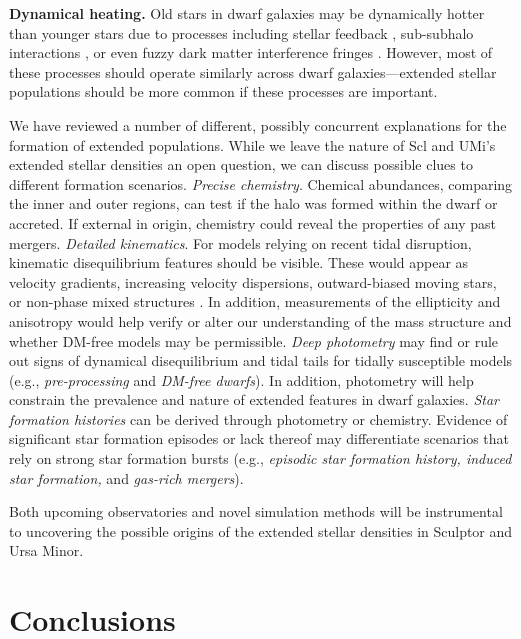 \documentclass{aa}
\begin{document}
\textbf{Dynamical heating.} Old stars in dwarf galaxies may be
dynamically hotter than younger stars due to processes including stellar
feedback
\citep{stinson+2009, maxwell+2012, el-badry+2016, mercado+2021},
sub-subhalo interactions \citep{penarrubia+2025}, or even fuzzy dark
matter interference fringes
\citep[e.g.,][]{el-zant+2020, duttachowdhury+2023}. However, most of
these processes should operate similarly across dwarf
galaxies---extended stellar populations should be more common if these
processes are important.

We have reviewed a number of different, possibly concurrent explanations
for the formation of extended populations. While we leave the nature of
Scl and UMi's extended stellar densities an open question, we can
discuss possible clues to different formation scenarios.
\emph{Precise chemistry}. Chemical abundances, comparing the inner and
outer regions, can test if the halo was formed within the dwarf or
accreted. If external in origin, chemistry could reveal the properties
of any past mergers.
\emph{Detailed kinematics}. For models relying on recent tidal
disruption, kinematic disequilibrium features should be visible. These
would appear as velocity gradients, increasing velocity dispersions,
outward-biased moving stars, or non-phase mixed structures
\citep[e.g,][]{kroupa1997, read+2006, sanchez-salcedo+hernandez2007}. In
addition, measurements of the ellipticity and anisotropy would help
verify or alter our understanding of the mass structure and whether
DM-free models may be permissible.
\emph{Deep photometry} may find or rule out signs of dynamical
disequilibrium and tidal tails for tidally susceptible models (e.g.,
\emph{pre-processing} and \emph{DM-free dwarfs}). In addition,
photometry will help constrain the prevalence and nature of extended
features in dwarf galaxies.
\emph{Star formation histories} can be derived through photometry or
chemistry. Evidence of significant star formation episodes or lack
thereof may differentiate scenarios that rely on strong star formation
bursts (e.g., \emph{episodic star formation history, induced star
formation,} and \emph{gas-rich mergers}).

Both upcoming observatories and novel simulation methods will be instrumental to uncovering the possible origins of the extended stellar densities in Sculptor and Ursa Minor.


\section{Conclusions}



\begin{acknowledgements}
\end{acknowledgements}



\end{document}
